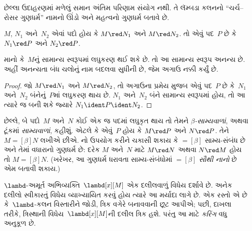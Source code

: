છેલ્લા ઉદાહરણમાં મળેલું સમાન અંતિમ પરિણામ સંયોગ નથી. તે
લૅમ્બડા કલનનો ``ચર્ચ--રોસર ગુણધર્મ'' નામનો ઊંડો અને મહત્વનો
ગુણધર્મ બતાવે છે.
\endgroup


\begingroup
\makeatletter{}\makeatother

\label{guunit:OLP-0346}


\begin{thm}
$M$, $N_1$ અને~$N_2$ એવાં પદો હોય કે $M \red N_1$ અને $M \red
N_2$. તો એવું પદ~$P$ છે કે $N_1 \red P$ અને $N_2 \red P$.
\end{thm}

\begin{cor}
માનો કે~$M$નું સામાન્ય સ્વરૂપમાં લઘુકરણ થઈ શકે છે. તો આ
સામાન્ય સ્વરૂપ અનન્ય છે.
અહીં અનન્યતા બંધ ચલોનું નામ બદલવા સુધીની છે, જેમ અગાઉ નક્કી કર્યું છે.
\end{cor}

\begin{proof}
જો $M \red N_1$ અને $M \red N_2$, તો અગાઉના પ્રમેય મુજબ એવું
પદ~$P$ છે કે~$N_1$ અને~$N_2$ બંનેનું~$P$માં લઘુકરણ થાય છે.
$N_1$ અને~$N_2$ બંને સામાન્ય સ્વરૂપમાં હોય, તો આ ત્યારે જ બની
શકે જ્યારે $N_1 \ident P \ident N_2$.
\end{proof}

છેલ્લે, બે પદો~$M$ અને~$N$ કોઈ એક જ પદમાં લઘુકૃત થાય તો તેમને
\emph{$\beta$-સામ્યવાળાં}, અથવા ટૂંકમાં \emph{સામ્યવાળાં},
કહીશું. એટલે કે એવું~$P$ હોય કે $M \red P$ અને $N \red P$.
તેને $M \equal[\beta] N$ લખીએ છીએ. 
નો ઉપયોગ કરીને ચકાસી શકાય કે
$\equal[\beta]$ સામ્ય-સંબંધ છે અને તેમાં વધારાનો ગુણધર્મ છે:
દરેક $M$ અને~$N$ માટે $M \red N$ અથવા $N \red M$ હોય તો
$M \equal[\beta] N$. (ખરેખર, આ ગુણધર્મ ધરાવતા સામ્ય-સંબંધોમાં
$\equal[\beta]$ \emph{સૌથી નાનો} છે એમ બતાવી શકાય.)
\endgroup


\begingroup
\makeatletter{}\makeatother

\label{guunit:OLP-0347}


$\lambd$-અમૂર્ત અભિવ્યક્તિ~$\lambd[x][M]$ એક દલીલવાળું
વિધેય દર્શાવે છે. અનેક દલીલો સ્વીકારતું વિધેય વ્યાખ્યાયિત કરવું
હોય ત્યારે આ મર્યાદા લાગે છે. એક રસ્તો એ છે કે~$\lambd$-કલન
વિસ્તારીને જોડી, ત્રિક વગેરે બનાવવાની છૂટ આપીએ; પછી, દાખલા
તરીકે, ત્રિસ્થાની વિધેય~$\lambd[x][M]$ની દલીલ ત્રિક હશે.
પરંતુ આ માટે \emph{કરિંગ} વધુ અનુકૂળ છે.

